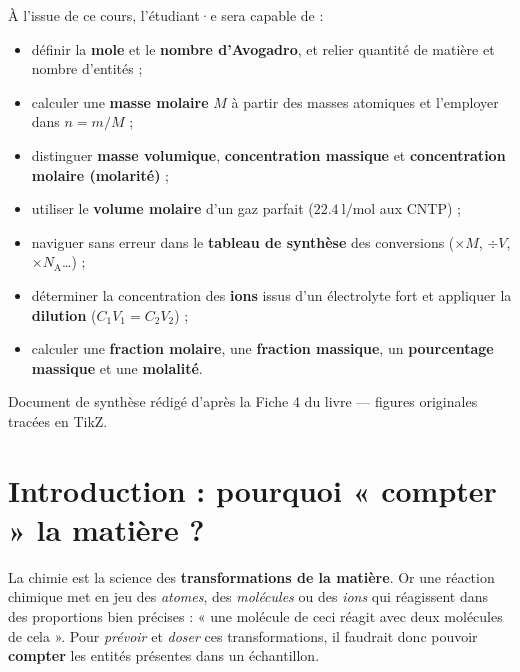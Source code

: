 \documentclass[11pt,a4paper]{article}
\newcommand{\NA}{N_{\!\text{A}}}
\begin{document}
\vfill

\begin{tcolorbox}[boxbase,colback=primary!5,colframe=primary,width=15cm,
    title={\textsc{Objectifs pédagogiques de la fiche}}]
À l'issue de ce cours, l'étudiant·e sera capable de :
\begin{itemize}[leftmargin=1.6em,topsep=2pt,itemsep=1pt]
  \item définir la \textbf{mole} et le \textbf{nombre d'Avogadro}, et relier quantité de matière et nombre d'entités ;
  \item calculer une \textbf{masse molaire} $M$ à partir des masses atomiques et l'employer dans $n=m/M$ ;
  \item distinguer \textbf{masse volumique}, \textbf{concentration massique} et \textbf{concentration molaire (molarité)} ;
  \item utiliser le \textbf{volume molaire} d'un gaz parfait ($\SI{22.4}{\litre\per\mole}$ aux CNTP) ;
  \item naviguer sans erreur dans le \textbf{tableau de synthèse} des conversions ($\times M$, $\div V$, $\times \NA$\ldots) ;
  \item déterminer la concentration des \textbf{ions} issus d'un électrolyte fort et appliquer la \textbf{dilution} ($C_1V_1=C_2V_2$) ;
  \item calculer une \textbf{fraction molaire}, une \textbf{fraction massique}, un \textbf{pourcentage massique} et une \textbf{molalité}.
\end{itemize}
\end{tcolorbox}

\vspace{0.4cm}
{\small\color{black!60} Document de synthèse rédigé d'après la Fiche 4 du livre — figures originales tracées en TikZ.}
\par
\endgroup

\newpage
\renewcommand{\contentsname}{\textcolor{primarydark}{Table des matières}}
\tableofcontents
\thispagestyle{fancy}
\newpage

\section{Introduction : pourquoi « compter » la matière ?}
La chimie est la science des \textbf{transformations de la matière}. Or une réaction chimique
met en jeu des \emph{atomes}, des \emph{molécules} ou des \emph{ions} qui réagissent dans des
proportions bien précises : « une molécule de ceci réagit avec deux molécules de cela ». Pour
\emph{prévoir} et \emph{doser} ces transformations, il faudrait donc pouvoir \textbf{compter} les
entités présentes dans un échantillon.
\end{document}
